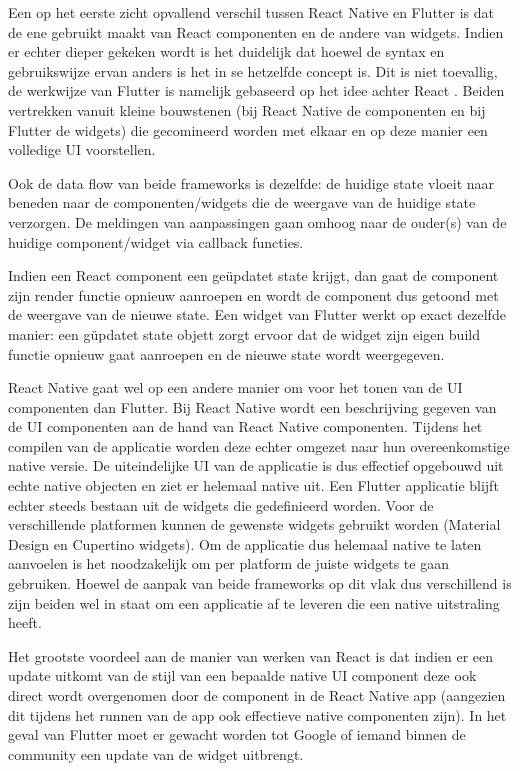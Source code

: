 Een op het eerste zicht opvallend verschil tussen React Native en Flutter is dat de ene gebruikt maakt van React componenten en de andere van widgets. Indien er echter dieper gekeken wordt is het duidelijk dat hoewel de syntax en gebruikswijze ervan anders is het in se hetzelfde concept is. Dit is niet toevallig, de werkwijze van Flutter is namelijk gebaseerd op het idee achter React \autocite{IntroductionToWidgets}. Beiden vertrekken vanuit kleine bouwstenen (bij React Native de componenten en bij Flutter de widgets) die gecomineerd worden met elkaar en op deze manier een volledige UI voorstellen. 

Ook de data flow van beide frameworks is dezelfde: de huidige state vloeit naar beneden naar de componenten/widgets die de weergave van de huidige state verzorgen. De meldingen van aanpassingen gaan omhoog naar de ouder(s) van de huidige component/widget via callback functies.

Indien een React component een geüpdatet state krijgt, dan gaat de component zijn render functie opnieuw aanroepen en wordt de component dus getoond met de weergave van de nieuwe state. Een widget van Flutter werkt op exact dezelfde manier: een güpdatet state objett zorgt ervoor dat de widget zijn eigen build functie opnieuw gaat aanroepen en de nieuwe state wordt weergegeven.

React Native gaat wel op een andere manier om voor het tonen van de UI componenten dan Flutter. Bij React Native wordt een beschrijving gegeven van de UI componenten aan de hand van React Native componenten. Tijdens het compilen van de applicatie worden deze echter omgezet naar hun overeenkomstige native versie. De uiteindelijke UI van de applicatie is dus effectief opgebouwd uit echte native objecten en ziet er helemaal native uit. Een Flutter applicatie blijft echter steeds bestaan uit de widgets die gedefinieerd worden. Voor de verschillende platformen kunnen de gewenste widgets gebruikt worden (Material Design en Cupertino widgets). Om de applicatie dus helemaal native te laten aanvoelen is het noodzakelijk om per platform de juiste widgets te gaan gebruiken. Hoewel de aanpak van beide frameworks op dit vlak dus verschillend is zijn beiden wel in staat om een applicatie af te leveren die een native uitstraling heeft.

Het grootste voordeel aan de manier van werken van React is dat indien er een update uitkomt van de stijl van een bepaalde native UI component deze ook direct wordt overgenomen door de component in de React Native app (aangezien dit tijdens het runnen van de app ook effectieve native componenten zijn). In het geval van Flutter moet er gewacht worden tot Google of iemand binnen de community een update van de widget uitbrengt.

